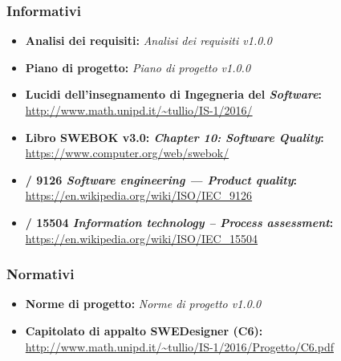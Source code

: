     \subsubsection{Informativi}
      \begin{itemize}
        \item \textbf{Analisi dei requisiti:} \emph{Analisi dei requisiti v1.0.0}
        \item \textbf{Piano di progetto:} \emph{Piano di progetto v1.0.0}
        \item \textbf{Lucidi dell'insegnamento di Ingegneria del \emph{Software}:}\\
        \url{http://www.math.unipd.it/~tullio/IS-1/2016/}
        \item \textbf{Libro SWEBOK v3.0: \emph{Chapter 10: Software Quality}:}\\
        \url{https://www.computer.org/web/swebok/}
        \item \textbf{/ 9126 \emph{Software engineering — Product quality}:}\\
        \url{https://en.wikipedia.org/wiki/ISO/IEC_9126}
        \item \textbf{/ 15504 \emph{Information technology – Process assessment}:}\\
        \url{https://en.wikipedia.org/wiki/ISO/IEC_15504}
      \end{itemize}
    \subsubsection{Normativi}
      \begin{itemize}
        \item \textbf{Norme di progetto:} \emph{Norme di progetto v1.0.0}
        \item \textbf{Capitolato di appalto SWEDesigner (C6):}\\
        \url{http://www.math.unipd.it/~tullio/IS-1/2016/Progetto/C6.pdf}
      \end{itemize}
